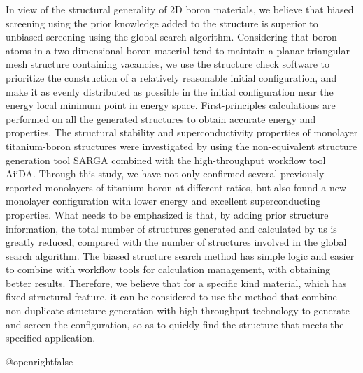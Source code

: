 \documentclass[phd,nobackinfo]{scutthesis}
\begin{document}
\begin{englishabstract}
In view of the structural generality of 2D boron materials, we believe that biased screening using the prior knowledge added to the structure is superior to unbiased screening using the global search algorithm. Considering that boron atoms in a two-dimensional boron material tend to maintain a planar triangular mesh structure containing vacancies, we use the structure check software to prioritize the construction of a relatively reasonable initial configuration, and make it as evenly distributed as possible in the initial configuration near the energy local minimum point in energy space. First-principles calculations are performed on all the generated structures to obtain accurate energy and properties.
The structural stability and superconductivity properties of monolayer titanium-boron structures were investigated by using the non-equivalent structure generation tool SARGA combined with the high-throughput workflow tool AiiDA.
Through this study, we have not only confirmed several previously reported monolayers of titanium-boron at different ratios, but also found a new  monolayer configuration with lower energy and excellent superconducting properties. 
What needs to be emphasized is that, by adding prior structure information, the total number of structures generated and calculated by us is greatly reduced, compared with the number of structures involved in the global search algorithm. 
The biased structure search method has simple logic and easier to combine with workflow tools for calculation management, with obtaining better results. 
Therefore, we believe that for a specific kind material, which has fixed structural feature, it can be considered to use the method that combine non-duplicate structure generation with high-throughput technology to generate and screen the configuration, so as to quickly find the structure that meets the specified application.
\end{englishabstract}

\tableofcontents

\mainmatter

\csname @openrightfalse\endcsname
\end{document}
